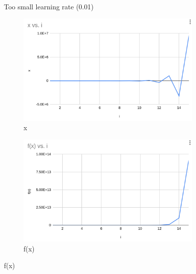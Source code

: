 \documentclass{article}
\begin{document}
\begin{figure}
    \caption{Too small learning rate (0.01)}
    \label{fig:enter-label}
\end{figure}

\begin{figure}
    \centering
    \begin{subfigure}{0.3\linewidth}
        \centering
        \includegraphics[width=\linewidth]{x_h.png}
        \caption{x}
        \label{fig:enter-label}
    \end{subfigure}
    
    
    \begin{subfigure}{0.3\linewidth}
        \centering
        \includegraphics[width=\linewidth]{fx_h.png}
        \caption{f(x)}
        \label{fig:enter-label}
    \end{subfigure}
    

\end{figure}
\end{document}

